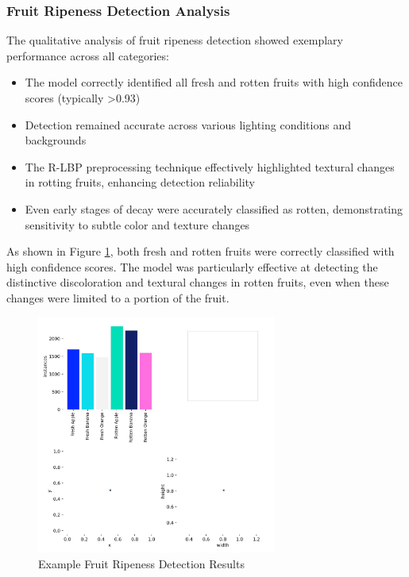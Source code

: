 \begin{multicols}{2}
\subsubsection{Fruit Ripeness Detection Analysis}

The qualitative analysis of fruit ripeness detection showed exemplary performance across all categories:

\begin{itemize}
    \item The model correctly identified all fresh and rotten fruits with high confidence scores (typically >0.93)
    \item Detection remained accurate across various lighting conditions and backgrounds
    \item The R-LBP preprocessing technique effectively highlighted textural changes in rotting fruits, enhancing detection reliability
    \item Even early stages of decay were accurately classified as rotten, demonstrating sensitivity to subtle color and texture changes
\end{itemize}

As shown in Figure \ref{fig:fruit_examples}, both fresh and rotten fruits were correctly classified with high confidence scores. The model was particularly effective at detecting the distinctive discoloration and textural changes in rotten fruits, even when these changes were limited to a portion of the fruit.
\end{multicols}

\begin{figure}[ht]
\centering
\includegraphics[width=0.7\textwidth]{datas/agriculture/labels.jpg}
\caption{Example Fruit Ripeness Detection Results}
\label{fig:fruit_examples}
\end{figure}

